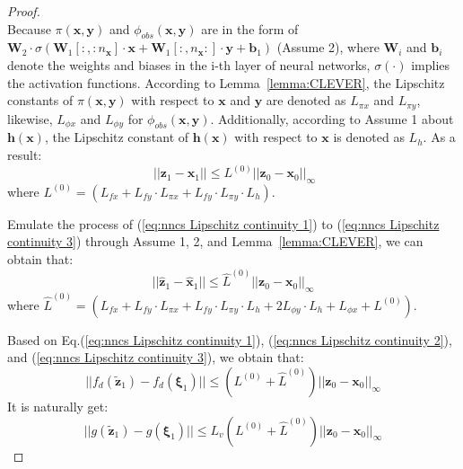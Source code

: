 \documentclass[conference]{IEEEtran}
\newtheorem{proof}{\bf Proof}
\newcommand{\myvec}[1]{\boldsymbol{#1}}
\begin{document}
\begin{proof}
\begin{equation}
    \end{equation}
    Because $\pi(\myvec{x}, \myvec{y})$ and 
    $\phi_{obs}(\myvec{x}, \myvec{y})$ are in the form of 
    $\myvec{W}_{2}\cdot \sigma ( \myvec{W}_{1}[:,:n_{\myvec{x}}]\cdot \myvec{x}
    + \myvec{W}_{1}[:,n_{\myvec{x}}:]\cdot \myvec{y} + \myvec{b}_{1})$ (Assume 2), 
    where $\myvec{W}_{i}$ and $\myvec{b}_{i}$ denote the weights and biases in 
    the i-th layer of neural networks, $\sigma(\cdot)$ implies the activation 
    functions. 
    According to Lemma~\ref{lemma:CLEVER}, 
    the Lipschitz constants of $\pi(\myvec{x}, \myvec{y})$ with respect to 
    $\myvec{x}$ and $\myvec{y}$ are denoted as $L_{\pi x}$ and $L_{\pi y}$, 
    likewise, $L_{\phi x}$ and $L_{\phi y}$ for $\phi_{obs}(\myvec{x}, \myvec{y})$. 
    Additionally, according to Assume 1 about $\myvec{h}(\myvec{x})$, the Lipschitz constant of $\myvec{h}(\myvec{x})$ with 
    respect to $\myvec{x}$ is denoted as $L_{h}$. As a result: 
    \begin{equation}~\label{eq:nncs Lipschitz continuity 3}
      ||\myvec{z}_{1} - \myvec{x}_{1}|| \leq
      L^{(0)}||\myvec{z}_{0} - \myvec{x}_{0}||_{\infty}
    \end{equation}
    where $L^{(0)} = (L_{fx} + L_{fy}\cdot L_{\pi x} + L_{fy}\cdot L_{\pi y}\cdot L_{h})$. 

    Emulate the process of (\ref{eq:nncs Lipschitz continuity 1}) 
    to (\ref{eq:nncs Lipschitz continuity 3}) through 
    Assume 1, 2, and Lemma~\ref{lemma:CLEVER}, we can obtain that: 
    \begin{equation}
      ||\hat{\myvec{z}}_{1} - \hat{\myvec{x}}_{1}|| \leq \hat{L}^{(0)}||\myvec{z}_{0} - \myvec{x}_{0}||_{\infty}
    \end{equation}
    where $\hat{L}^{(0)} = 
    (L_{fx} + L_{fy}\cdot L_{\pi x} + L_{fy}\cdot L_{\pi y}\cdot L_{h} + 2 L_{\phi y}\cdot L_{h} 
    + L_{\phi x} + L^{(0)})$. 
  
    Based on Eq.(\ref{eq:nncs Lipschitz continuity 1}), (\ref{eq:nncs Lipschitz continuity 2}), 
    and (\ref{eq:nncs Lipschitz continuity 3}), we obtain that: 
    \begin{equation}\label{eq:nncs Lipschitz continuity 4}
      ||f_{d}(\tilde{\myvec{z}}_{1}) - f_{d}(\myvec{\xi}_{1})|| 
      \leq (L^{(0)} + \hat{L}^{(0)})|| \myvec{z}_{0} - \myvec{x}_{0} ||_{\infty}
    \end{equation}
    It is naturally get: 
    \begin{equation}\label{eq:nncs Lipschitz continuity 5}
      ||g(\tilde{\myvec{z}}_{1}) - g(\myvec{\xi}_{1})|| 
      \leq L_{v}(L^{(0)} + \hat{L}^{(0)})|| \myvec{z}_{0} - \myvec{x}_{0} ||_{\infty}
    \end{equation}
  

\end{proof}
\end{document}
